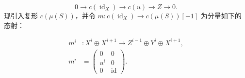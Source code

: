 \[
0\longrightarrow c(\operatorname{id}_X)\longrightarrow c(u)
\longrightarrow Z\longrightarrow0.
\]
现引入复形 $c(\mu(S))$，并令
$m\colon c(\operatorname{id}_X)\longrightarrow c(\mu(S))[-1]$ 为分量如下的
态射：

\begin{equation}
\begin{aligned}
m^i&\colon X^i\oplus X^{i+1}
  \longrightarrow Z^{i-1}\oplus Y^i\oplus X^{i+1},\\[2pt]
m^i&=
\begin{pmatrix}
0&0\\
u^i&0\\
0&\operatorname{id}
\end{pmatrix}.
\end{aligned}
\tag{1.3.2.2}
\end{equation}
\endgroup
